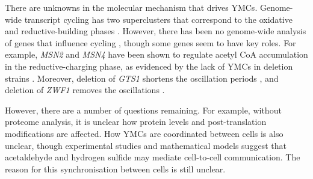 
There are unknowns in the molecular mechanism that drives YMCs.
Genome-wide transcript cycling has two superclusters that correspond to the oxidative and reductive-building phases \citep{machneYinYangYeast2012}.
However, there has been no genome-wide analysis of genes that influence cycling \citep{mellorMolecularBasisMetabolic2016}, though some genes seem to have key roles.
For example, \emph{MSN2} and \emph{MSN4} have been shown to regulate acetyl CoA accumulation in the reductive-charging phase, as evidenced by the lack of YMCs in deletion strains \citep{kuangMsn2RegulateExpression2017}.
Moreover, deletion of \emph{GTS1} shortens the oscillation periods \citep{lloydUltradianMetronomeTimekeeper2005},
and deletion of \emph{ZWF1} removes the oscillations \citep{tuCyclicChangesMetabolic2007}.

However, there are a number of questions remaining.
For example, without proteome analysis, it is unclear how protein levels and post-translation modifications are affected.
How YMCs are coordinated between cells is also unclear, though experimental studies \citep{murrayRegulationYeastOscillatory2007} and mathematical models
\citep{krishnaMinimalPushPull2018} suggest that acetaldehyde and hydrogen sulfide may mediate cell-to-cell communication.
The reason for this synchronisation between cells is still unclear. %


